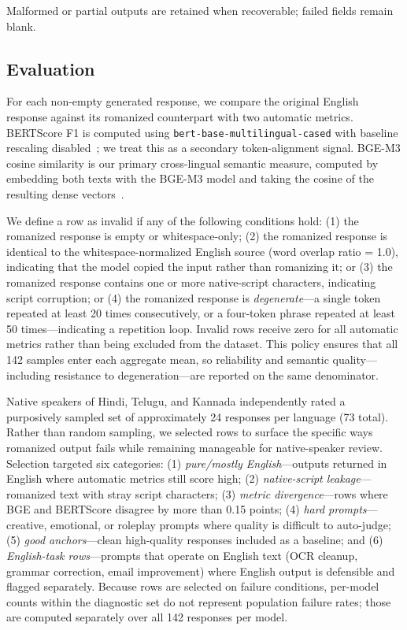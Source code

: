Malformed or partial outputs are retained when recoverable; failed fields
remain blank. 

\subsection{Evaluation}

\enspace
For each non-empty generated response, we compare the original English
response against its romanized counterpart with two automatic metrics.
BERTScore F1 is computed using \texttt{bert-base-multilingual-cased} with
baseline rescaling disabled~\cite{zhang2020bertscore}; we treat this as a
secondary token-alignment signal. BGE-M3 cosine similarity is our primary
cross-lingual semantic measure, computed by embedding both texts with the
BGE-M3 model and taking the cosine of the resulting dense
vectors~\cite{chen2024bgem3}.

\enspace
We define a row as invalid if any of the following conditions hold: (1) the
romanized response is empty or whitespace-only; (2) the romanized response is
identical to the whitespace-normalized English source (word overlap ratio
= 1.0), indicating that the model copied the input rather than romanizing it;
or (3) the romanized response contains one or more native-script characters,
indicating script corruption; or (4) the romanized response is
\emph{degenerate}---a single token repeated at least 20 times consecutively,
or a four-token phrase repeated at least 50 times---indicating a repetition
loop. Invalid rows receive zero for all automatic metrics rather than being
excluded from the dataset. This policy ensures that all 142 samples enter each
aggregate mean, so reliability and semantic quality---including resistance to
degeneration---are reported on the same denominator.

\enspace
Native speakers of Hindi, Telugu, and Kannada independently rated a
purposively sampled set of approximately 24 responses per language (73 total).
Rather than random sampling, we selected rows to surface the specific ways
romanized output fails while remaining manageable for native-speaker review.
Selection targeted six categories: (1) \emph{pure/mostly English}---outputs
returned in English where automatic metrics still score high; (2)
\emph{native-script leakage}---romanized text with stray script characters;
(3) \emph{metric divergence}---rows where BGE and BERTScore disagree by more
than 0.15 points; (4) \emph{hard prompts}---creative, emotional, or roleplay
prompts where quality is difficult to auto-judge; (5) \emph{good
anchors}---clean high-quality responses included as a baseline; and (6)
\emph{English-task rows}---prompts that operate on English text (OCR cleanup,
grammar correction, email improvement) where English output is defensible and
flagged separately. Because rows are selected on failure conditions, per-model
counts within the diagnostic set do not represent population failure rates;
those are computed separately over all 142 responses per model.

